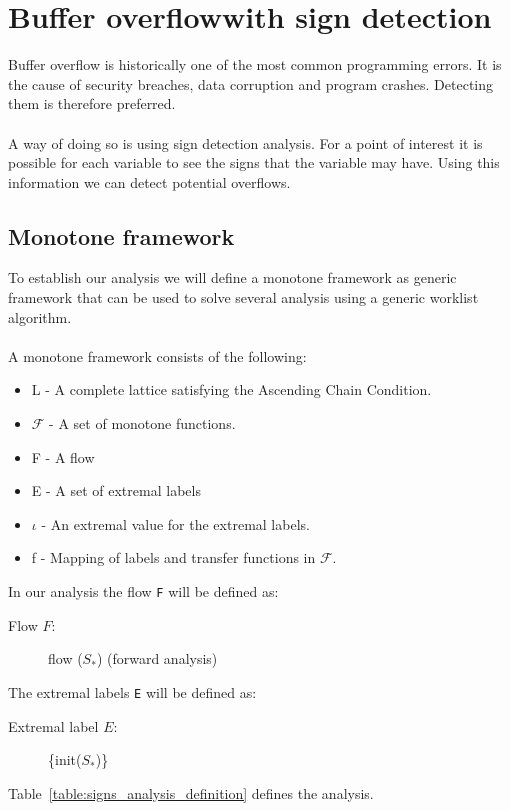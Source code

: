 {\setlength{\chapterfontsize}{24pt}
\chapter{Buffer overflowwith sign detection}
}\label{sec:exercise3}

Buffer overflow is historically one of the most common programming errors. It is the cause of security breaches, data corruption and program crashes. Detecting them is therefore preferred.
\\\\
A way of doing so is using sign detection analysis. For a point of interest it is possible for each variable to see the signs that the variable may have. Using this information we can detect potential overflows.

\section{Monotone framework}
To establish our analysis we will define a monotone framework as generic framework that can be used to solve several analysis using a generic worklist algorithm.
\\\\
A monotone framework consists of the following:
\begin{itemize}
	\item L - A complete lattice satisfying the Ascending Chain Condition.
	\item $\mathcal{F}$ - A set of monotone functions.
	\item F - A flow
	\item E - A set of extremal labels
	\item $\iota$ - An extremal value for the extremal labels.
	\item f - Mapping of labels and transfer functions in $\mathcal{F}$.
\end{itemize}
In our analysis the flow \texttt{F} will be defined as:
\begin{description}
  \item[Flow $F$:] flow ($S_*$) (forward analysis)
\end{description}
The extremal labels \texttt{E} will be defined as:
\begin{description}
    \item[Extremal label $E$:] \{init($S_*$)\}
\end{description}
\noindent Table~\ref{table:signs_analysis_definition} defines the analysis.
